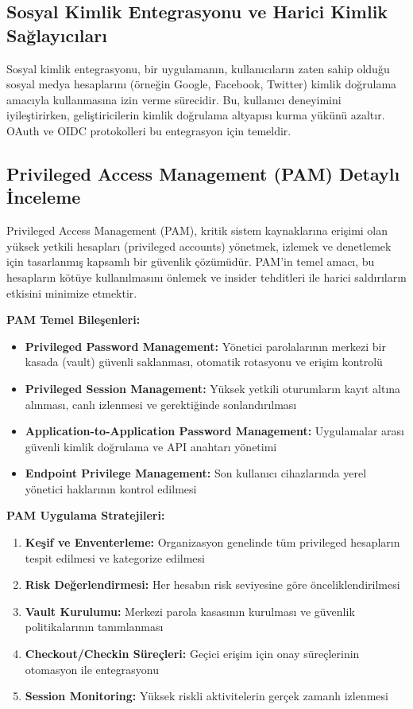 \subsection{Sosyal Kimlik Entegrasyonu ve Harici Kimlik Sağlayıcıları}

Sosyal kimlik entegrasyonu, bir uygulamanın, kullanıcıların zaten sahip olduğu sosyal medya hesaplarını (örneğin Google, Facebook, Twitter) kimlik doğrulama amacıyla kullanmasına izin verme sürecidir. Bu, kullanıcı deneyimini iyileştirirken, geliştiricilerin kimlik doğrulama altyapısı kurma yükünü azaltır. OAuth ve OIDC protokolleri bu entegrasyon için temeldir.

\subsection{Privileged Access Management (PAM) Detaylı İnceleme}

Privileged Access Management (PAM), kritik sistem kaynaklarına erişimi olan yüksek yetkili hesapları (privileged accounts) yönetmek, izlemek ve denetlemek için tasarlanmış kapsamlı bir güvenlik çözümüdür. PAM'in temel amacı, bu hesapların kötüye kullanılmasını önlemek ve insider tehditleri ile harici saldırıların etkisini minimize etmektir.

\textbf{PAM Temel Bileşenleri:}

\begin{itemize}
    \item \textbf{Privileged Password Management:} Yönetici parolalarının merkezi bir kasada (vault) güvenli saklanması, otomatik rotasyonu ve erişim kontrolü
    \item \textbf{Privileged Session Management:} Yüksek yetkili oturumların kayıt altına alınması, canlı izlenmesi ve gerektiğinde sonlandırılması
    \item \textbf{Application-to-Application Password Management:} Uygulamalar arası güvenli kimlik doğrulama ve API anahtarı yönetimi
    \item \textbf{Endpoint Privilege Management:} Son kullanıcı cihazlarında yerel yönetici haklarının kontrol edilmesi
\end{itemize}

\textbf{PAM Uygulama Stratejileri:}

\begin{enumerate}
    \item \textbf{Keşif ve Enventerleme:} Organizasyon genelinde tüm privileged hesapların tespit edilmesi ve kategorize edilmesi
    \item \textbf{Risk Değerlendirmesi:} Her hesabın risk seviyesine göre önceliklendirilmesi
    \item \textbf{Vault Kurulumu:} Merkezi parola kasasının kurulması ve güvenlik politikalarının tanımlanması
    \item \textbf{Checkout/Checkin Süreçleri:} Geçici erişim için onay süreçlerinin otomasyon ile entegrasyonu
    \item \textbf{Session Monitoring:} Yüksek riskli aktivitelerin gerçek zamanlı izlenmesi
\end{enumerate}

